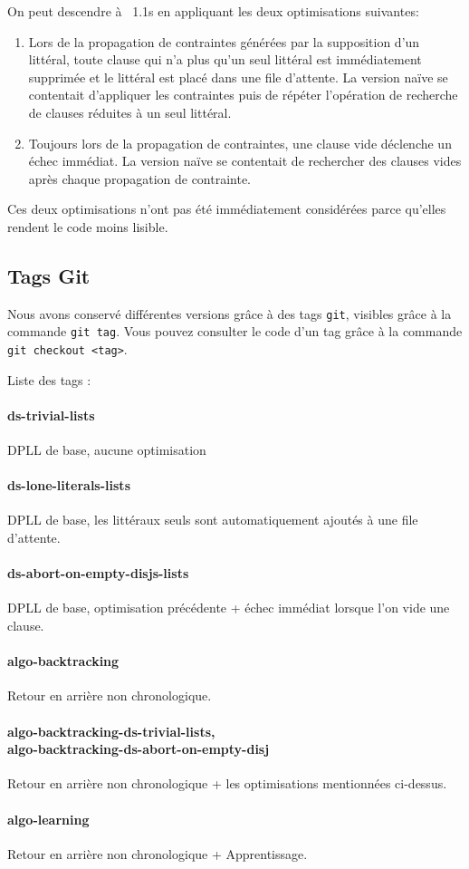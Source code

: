 \documentclass[10pt,a4paper]{article}
\begin{document}
On peut descendre à ~1.1s en appliquant les deux optimisations suivantes:
\begin{enumerate} \item Lors de la propagation de contraintes générées par la
      supposition d'un littéral, toute clause qui n'a plus qu'un seul littéral
      est immédiatement supprimée et le littéral est placé dans une file
      d'attente. La version naïve se contentait d'appliquer les contraintes
      puis de répéter l'opération de recherche de clauses réduites à un seul
      littéral.  \item Toujours lors de la propagation de contraintes, une
    clause vide déclenche un échec immédiat. La version naïve se contentait de
rechercher des clauses vides après chaque propagation de contrainte.
\end{enumerate}

Ces deux optimisations n'ont pas été immédiatement considérées parce qu'elles
rendent le code moins lisible.

\subsection{Tags Git}

Nous avons conservé différentes versions grâce à des tags {\tt git}, visibles grâce
à la commande {\tt git tag}. Vous pouvez consulter le code d'un tag grâce à la
commande {\tt git checkout <tag>}.

Liste des tags : 

\paragraph{ds-trivial-lists} DPLL de base, aucune optimisation 
\paragraph{ds-lone-literals-lists} DPLL de base, les littéraux seuls sont automatiquement
ajoutés à une file d'attente.
\paragraph{ds-abort-on-empty-disjs-lists} DPLL de base,
optimisation précédente + échec immédiat lorsque l'on vide une clause.
\paragraph{algo-backtracking} Retour en arrière non chronologique.
\paragraph{algo-backtracking-ds-trivial-lists,\\ algo-backtracking-ds-abort-on-empty-disj} Retour en arrière non chronologique + les optimisations mentionnées ci-dessus.
\paragraph{algo-learning} Retour en arrière non chronologique + Apprentissage.
\end{document}
